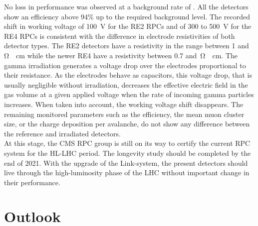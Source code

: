 	No loss in performance was observed at a background rate of . All the detectors show an efficiency above 94\% up to the required background level. The recorded shift in working voltage of \SI{100}{V} for the RE2 RPCs and of 300 to \SI{500}{V} for the RE4 RPCs is consistent with the difference in electrode resistivities of both detector types. The RE2 detectors have a resistivity in the range between 1 and \,\si{\ohm\cdot cm} while the newer RE4 have a resistivity between 0.7 and \,\si{\ohm\cdot cm}. The gamma irradiation generates a voltage drop over the electrodes proportional to their resistance. As the electrodes behave as capacitors, this voltage drop, that is usually negligible without irradiation, decreases the effective electric field in the gas volume at a given applied voltage when the rate of incoming gamma particles increases. When taken into account, the working voltage shift disappears. The remaining monitored parameters such as the efficiency, the mean muon cluster size, or the charge deposition per avalanche, do not show any difference between the reference and irradiated detectors.\\
	At this stage, the CMS RPC group is still on its way to certify the current RPC system for the HL-LHC period. The longevity study should be completed by the end of 2021. With the upgrade of the Link-system, the present detectors should live through the high-luminosity phase of the LHC without important change in their performance.

	\section{Outlook}
	\label{chapt7:sec:outlook}
	
